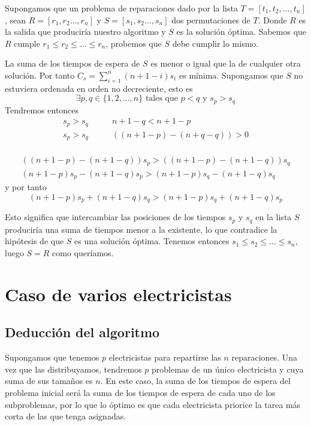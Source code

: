 \documentclass[a4]{article}
\begin{document}
Supongamos que un problema de reparaciones dado por la lista
$T=[t_1,t_2,\ldots,t_n]$, sean $R=[r_1,r_2\ldots,r_n]$ y
$S=[s_1,s_2\ldots,s_n]$ dos permutaciones de $T$. Donde $R$ es la
salida que produciría nuestro algoritmo y $S$ es la solución óptima.
Sabemos que $R$ cumple $r_1 \leq r_2 \leq \ldots \leq r_n$, probemos
que $S$ debe cumplir lo mismo.

La suma de los tiempos de espera de $S$ es menor o igual que la de
cualquier otra solución. Por tanto \(C_s = \sum_{i=1}^n (n+1-i)s_i\)
es mínima. Supongamos que $S$ no estuviera ordenada en orden no
decreciente, esto es
\[\exists p,q \in \{1,2,\ldots,n\} \mbox{ tales que } p<q \mbox{ y } s_p
  > s_q\]
Tendremos entonces
\begin{align*}
  s_p > s_q& \qquad n+1-q < n+1-p\\
  s_p > s_q& \qquad ((n+1-p) - (n+q-q)) > 0 \\
\end{align*}

\vspace{-15mm}

\begin{align*}    
  ((n+1-p) - (n+1-q))s_p > ((n+1-p) - (n+1-q))s_q \\
  (n+1-p)s_p - (n+1-q)s_p > (n+1-p)s_q - (n+1-q)s_q
\end{align*}
y por tanto
\[(n+1-p)s_p + (n+1-q)s_q > (n+1-p)s_q + (n+1-q)s_p\]

Esto significa que intercambiar las posiciones de los tiempos $s_p$ y
$s_q$ en la lista $S$ produciría una suma de tiempos menor a la
existente, lo que contradice la hipótesis de que $S$ es una solución
óptima. Tenemos entonces $s_1 \leq s_2 \leq \ldots \leq s_n$, luego
$S=R$ como queríamos.

\hfill\qedsymbol

\section{Caso de varios electricistas}

\subsection{Deducción del algoritmo}

Supongamos que tenemos $p$ electricistas para repartirse las $n$
reparaciones. Una vez que las distribuyamos, tendremos $p$ problemas
de un único electricista y cuya suma de sus tamaños es $n$. En este
caso, la suma de los tiempos de espera del problema inicial será la
suma de los tiempos de espera de cada uno de los subproblemas, por lo
que lo óptimo es que cada electricista priorice la tarea más corta de
las que tenga asignadas.
\end{document}
